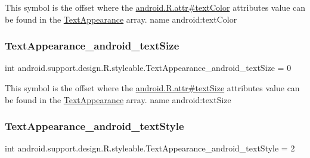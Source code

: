 This symbol is the offset where the \hyperlink{}{android.\+R.\+attr\#text\+Color} attribute\textquotesingle{}s value can be found in the \hyperlink{classandroid_1_1support_1_1design_1_1R_1_1styleable_a23dc46ec989f92f528b46568dad7e726}{Text\+Appearance} array.  name android\+:text\+Color \mbox{\label{classandroid_1_1support_1_1design_1_1R_1_1styleable_a360f5c584c9ab85d870c4a194a6822f1}} 
\subsubsection{\texorpdfstring{Text\+Appearance\+\_\+android\+\_\+text\+Size}{TextAppearance\_android\_textSize}}
{\footnotesize\ttfamily int android.\+support.\+design.\+R.\+styleable.\+Text\+Appearance\+\_\+android\+\_\+text\+Size = 0\hspace{0.3cm}{\ttfamily [static]}}

This symbol is the offset where the \hyperlink{}{android.\+R.\+attr\#text\+Size} attribute\textquotesingle{}s value can be found in the \hyperlink{classandroid_1_1support_1_1design_1_1R_1_1styleable_a23dc46ec989f92f528b46568dad7e726}{Text\+Appearance} array.  name android\+:text\+Size \mbox{\label{classandroid_1_1support_1_1design_1_1R_1_1styleable_a0a2a5b4e6900c18a9611ee403142f371}} 
\subsubsection{\texorpdfstring{Text\+Appearance\+\_\+android\+\_\+text\+Style}{TextAppearance\_android\_textStyle}}
{\footnotesize\ttfamily int android.\+support.\+design.\+R.\+styleable.\+Text\+Appearance\+\_\+android\+\_\+text\+Style = 2\hspace{0.3cm}{\ttfamily [static]}}

